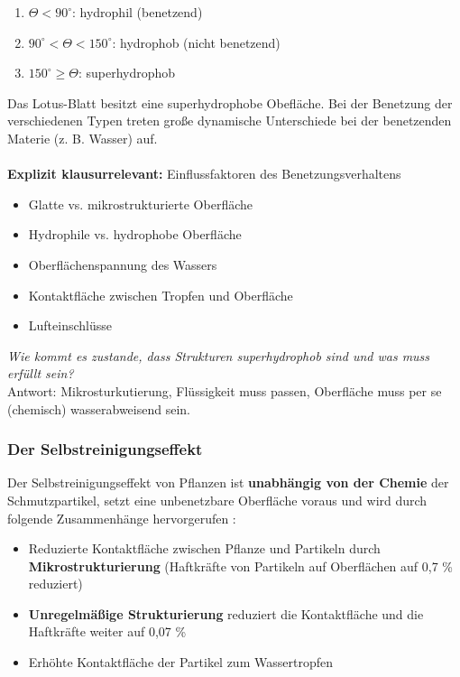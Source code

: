 \begin{enumerate}
    \item \textbf{$\Theta < 90^\circ$}: hydrophil (benetzend)
    \item \textbf{$90^\circ < \Theta < 150^\circ$}: hydrophob (nicht benetzend)
    \item \textbf{$150^\circ \geq \Theta$}: superhydrophob
\end{enumerate}
Das Lotus-Blatt besitzt eine superhydrophobe Obefläche. Bei der Benetzung der verschiedenen Typen treten große dynamische Unterschiede bei der benetzenden Materie (z. B. Wasser) auf. 
\\\\
\textbf{Explizit klausurrelevant:} Einflussfaktoren des Benetzungsverhaltens \hintsign

\begin{itemize}
    \item Glatte vs. mikrostrukturierte Oberfläche
    \item Hydrophile vs. hydrophobe Oberfläche
    \item Oberflächenspannung des Wassers
    \item Kontaktfläche zwischen Tropfen und Oberfläche
    \item Lufteinschlüsse
\end{itemize}
\textit{Wie kommt es zustande, dass Strukturen superhydrophob sind und was muss erfüllt sein?}\\
Antwort: Mikrosturkutierung, Flüssigkeit muss passen, Oberfläche muss per se (chemisch) wasserabweisend sein.

\subsubsection{Der Selbstreinigungseffekt}

Der Selbstreinigungseffekt von Pflanzen ist \textbf{unabhängig von der Chemie} der Schmutzpartikel, setzt eine unbenetzbare Oberfläche voraus und wird durch folgende Zusammenhänge hervorgerufen \hintsign:

\begin{itemize}
    \item Reduzierte Kontaktfläche zwischen Pflanze und Partikeln durch \textbf{Mikrostrukturierung} (Haftkräfte von Partikeln auf Oberflächen auf 0,7 \% reduziert)
    \item \textbf{Unregelmäßige Strukturierung} reduziert die Kontaktfläche und die Haftkräfte weiter auf 0,07 \%
    \item Erhöhte Kontaktfläche der Partikel zum Wassertropfen
\end{itemize}

